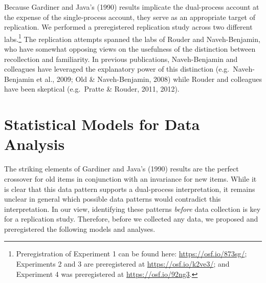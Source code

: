 \documentclass[english,,man,floatsintext]{apa6}
\begin{document}
Because Gardiner and Java's (1990) results implicate the dual-process account at the expense of the single-process account, they serve as an appropriate target of replication. We performed a preregistered replication study across two different labs.\footnote{Preregistration of Experiment 1 can be found here: \url{https://osf.io/873sg/}; Experiments 2 and 3 are preregistered at \url{https://osf.io/k2ve3/}; and Experiment 4 was preregistered at \url{https://osf.io/92ng3}.} The replication attempts spanned the labs of Rouder and Naveh-Benjamin, who have somewhat opposing views on the usefulness of the distinction between recollection and familiarity. In previous publications, Naveh-Benjamin and colleagues have leveraged the explanatory power of this distinction (e.g.~Naveh-Benjamin et al., 2009; Old \& Naveh-Benjamin, 2008) while Rouder and colleagues have been skeptical (e.g.~Pratte \& Rouder, 2011, 2012).

\hypertarget{statistical-models-for-data-analysis}{%
\section{Statistical Models for Data Analysis}\label{statistical-models-for-data-analysis}}

The striking elements of Gardiner and Java's (1990) results are the perfect crossover for old items in conjunction with an invariance for new items. While it is clear that this data pattern supports a dual-process interpretation, it remains unclear in general which possible data patterns would contradict this interpretation. In our view, identifying these patterns \emph{before} data collection is key for a replication study. Therefore, before we collected any data, we proposed and preregistered the following models and analyses.
\end{document}
